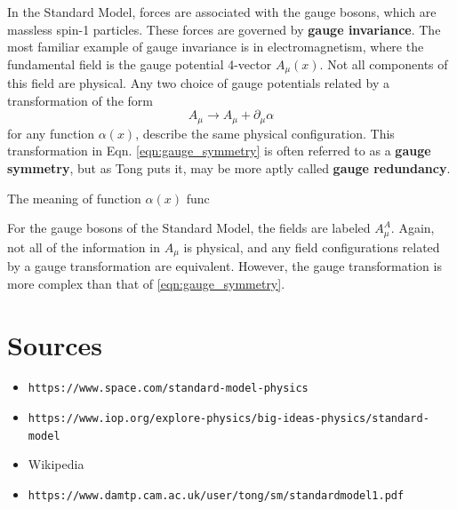 \documentclass{article}
\begin{document}
In the Standard Model, forces are associated with the gauge bosons, which are massless spin-1 particles. These forces are governed by \textbf{gauge invariance}. The most familiar example of gauge invariance is in electromagnetism, where the fundamental field is the gauge potential 4-vector $A_\mu(x)$. Not all components of this field are physical. Any two choice of gauge potentials related by a transformation of the form \begin{equation} A_\mu \rightarrow A_\mu + \partial_\mu \alpha \label{eqn:gauge_symmetry}\end{equation} for any function $\alpha(x)$, describe the same physical configuration. This transformation in Eqn. \ref{eqn:gauge_symmetry} is often referred to as a \textbf{gauge symmetry}, but as Tong puts it, may be more aptly called \textbf{gauge redundancy}.

The meaning of  function $\alpha(x)$ func

For the gauge bosons of the Standard Model, the fields are labeled $A_\mu^{A}$. Again, not all of the information in $A_\mu$ is physical, and any field configurations related by a gauge transformation are equivalent. However, the gauge transformation is more complex than that of \ref{eqn:gauge_symmetry}.


\section{Sources}

    \begin{itemize}
        \item \texttt{https://www.space.com/standard-model-physics}
        \item \texttt{https://www.iop.org/explore-physics/big-ideas-physics/standard-model}
        \item Wikipedia
        \item \texttt{https://www.damtp.cam.ac.uk/user/tong/sm/standardmodel1.pdf}
    \end{itemize}
\end{document}
